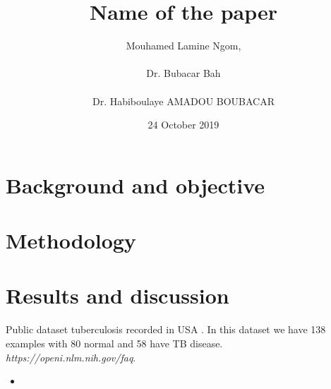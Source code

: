 \documentclass[11pt, oneside]{article}   	%
\title{Name of the paper}
\author{Mouhamed Lamine Ngom, \\\\ Dr. Bubacar Bah \\\\ Dr. Habiboulaye AMADOU BOUBACAR }
\date{{\small 24 October 2019}\\%
   \vspace{0.5cm}{\texttt{[image: images/AIMS\_SA\_Logo.pdf]}}}
\begin{document}
\maketitle


\section{Background and objective}



\section{Methodology}




\section{Results and discussion}



\begin{thebibliography}{9}
Public dataset tuberculosis recorded in USA . In this dataset we have 138 examples with 80 normal and 58 have TB disease.\\
\textit{https://openi.nlm.nih.gov/faq}. 
\end{thebibliography}



\begin{itemize}
	\item 
		
\end{itemize}
\end{document}
